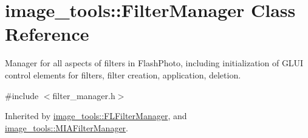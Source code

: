 \hypertarget{classimage__tools_1_1FilterManager}{}\section{image\+\_\+tools\+:\+:Filter\+Manager Class Reference}
\label{classimage__tools_1_1FilterManager}


Manager for all aspects of filters in Flash\+Photo, including initialization of G\+L\+UI control elements for filters, filter creation, application, deletion.  




{\ttfamily \#include $<$filter\+\_\+manager.\+h$>$}



Inherited by \hyperlink{classimage__tools_1_1FLFilterManager}{image\+\_\+tools\+::\+F\+L\+Filter\+Manager}, and \hyperlink{classimage__tools_1_1MIAFilterManager}{image\+\_\+tools\+::\+M\+I\+A\+Filter\+Manager}.

